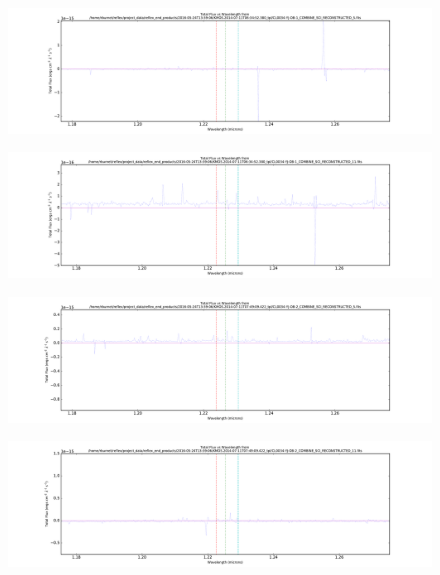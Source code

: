 \documentclass[10pt,letterpaper]{article}
\begin{document}
\begin{figure}[h!]
\includegraphics[scale=0.4]{figures/CL0034-YJ-OB-1_COMBINE_SCI_RECONSTRUCTED_5.pdf}
\end{figure}
\begin{figure}[h!]
\includegraphics[scale=0.4]{figures/CL0034-YJ-OB-1_COMBINE_SCI_RECONSTRUCTED_11.pdf}
\end{figure}
\begin{figure}[h!]
\includegraphics[scale=0.4]{figures/CL0034-YJ-OB-2_COMBINE_SCI_RECONSTRUCTED_5.pdf}
\end{figure}
\begin{figure}[h!]
\includegraphics[scale=0.4]{figures/CL0034-YJ-OB-2_COMBINE_SCI_RECONSTRUCTED_11.pdf}
\end{figure}
\end{document}

